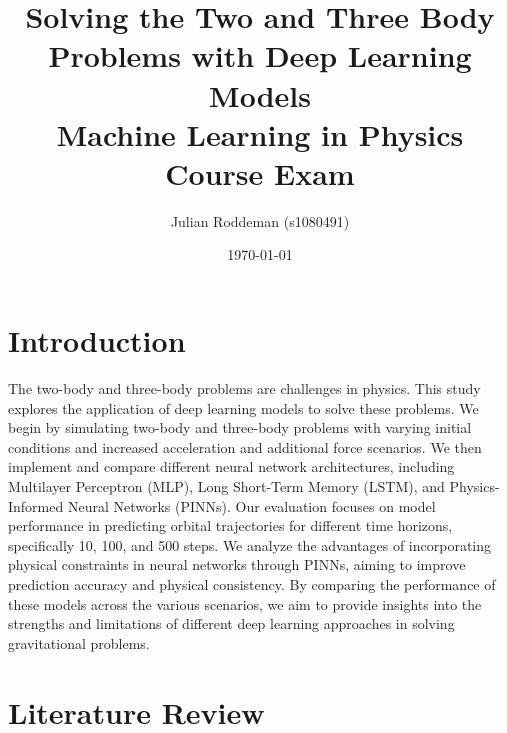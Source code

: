 \documentclass[11pt,a4paper, twocolumn]{article}
\title{Solving the Two and Three Body Problems with Deep Learning Models \\
  \large Machine Learning in Physics Course Exam}
\author{Julian Roddeman (s1080491)}
\date{\today}
\begin{document}
  \section{Introduction}
  \label{sec:introduction}
  The two-body and three-body problems are challenges in physics. This study explores the application of deep learning models to solve these problems. We begin by simulating two-body and three-body problems with varying initial conditions and increased acceleration and additional force scenarios. We then implement and compare different neural network architectures, including Multilayer Perceptron (MLP), Long Short-Term Memory (LSTM), and Physics-Informed Neural Networks (PINNs). Our evaluation focuses on model performance in predicting orbital trajectories for different time horizons, specifically 10, 100, and 500 steps. We analyze the advantages of incorporating physical constraints in neural networks through PINNs, aiming to improve prediction accuracy and physical consistency. By comparing the performance of these models across the various scenarios, we aim to provide insights into the strengths and limitations of different deep learning approaches in solving gravitational problems.

\section{Literature Review}
\label{sec:literature}
\end{document}
